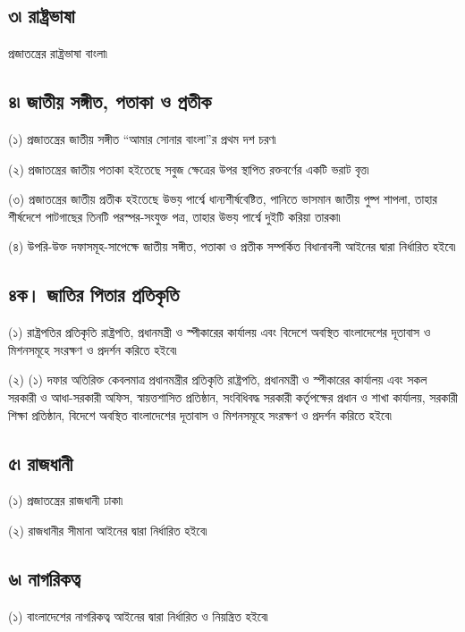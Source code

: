 \documentclass[11pt]{article}
\begin{document}
\subsection{৩৷ রাষ্ট্রভাষা}
\label{sec:orgec7a104}
প্রজাতন্ত্রের রাষ্ট্রভাষা বাংলা৷

\subsection{৪৷ জাতীয় সঙ্গীত, পতাকা ও প্রতীক}
\label{sec:org76a213c}
(১) প্রজাতন্ত্রের জাতীয় সঙ্গীত “আমার সোনার বাংলা”র প্রথম দশ চরণ৷

(২) প্রজাতন্ত্রের জাতীয় পতাকা হইতেছে সবুজ ক্ষেত্রের উপর স্থাপিত রক্তবর্ণের একটি
    ভরাট বৃত্ত৷

(৩) প্রজাতন্ত্রের জাতীয় প্রতীক হইতেছে উভয় পার্শ্বে ধান্যশীর্ষবেষ্টিত, পানিতে
    ভাসমান জাতীয় পুষ্প শাপলা, তাহার শীর্ষদেশে পাটগাছের তিনটি পরস্পর-সংযুক্ত পত্র,
    তাহার উভয় পার্শ্বে দুইটি করিয়া তারকা৷

(৪) উপরি-উক্ত দফাসমূহ-সাপেক্ষে জাতীয় সঙ্গীত, পতাকা ও প্রতীক সম্পর্কিত
    বিধানাবলী আইনের দ্বারা নির্ধারিত হইবে৷

\subsection{৪ক। জাতির পিতার প্রতিকৃতি}
\label{sec:org0ba9a35}
(১) রাষ্ট্রপতির প্রতিকৃতি রাষ্ট্রপতি, প্রধানমন্ত্রী ও স্পীকারের কার্যালয় এবং
   বিদেশে অবস্থিত বাংলাদেশের দূতাবাস ও মিশনসমূহে সংরক্ষণ ও প্রদর্শন করিতে হইবে৷

(২) (১) দফার অতিরিক্ত কেবলমাত্র প্রধানমন্ত্রীর প্রতিকৃতি রাষ্ট্রপতি, প্রধানমন্ত্রী
    ও স্পীকারের কার্যালয় এবং সকল সরকারী ও আধা-সরকারী অফিস, স্বায়ত্তশাসিত
    প্রতিষ্ঠান, সংবিধিবদ্ধ সরকারী কর্তৃপক্ষের প্রধান ও শাখা কার্যালয়, সরকারী শিক্ষা
    প্রতিষ্ঠান, বিদেশে অবস্থিত বাংলাদেশের দূতাবাস ও মিশনসমূহে সংরক্ষণ ও প্রদর্শন
    করিতে হইবে৷

\subsection{৫৷ রাজধানী}
\label{sec:org9bfd39c}
(১) প্রজাতন্ত্রের রাজধানী ঢাকা৷

(২) রাজধানীর সীমানা আইনের দ্বারা নির্ধারিত হইবে৷

\subsection{৬৷ নাগরিকত্ব}
\label{sec:orgb4e8316}
(১) বাংলাদেশের নাগরিকত্ব আইনের দ্বারা নির্ধারিত ও নিয়ন্ত্রিত হইবে৷
\end{document}
